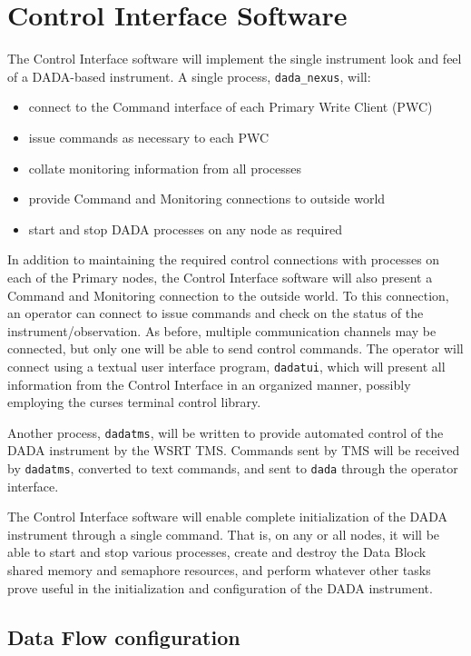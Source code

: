\chapter{Control Interface Software}

The Control Interface software will implement the single instrument
look and feel of a DADA-based instrument.  A single process, {\tt dada\_nexus}, will:

\begin{itemize}
\item connect to the Command interface of each Primary Write Client (PWC)
\item issue commands as necessary to each PWC
\item collate monitoring information from all processes
\item provide Command and Monitoring connections to outside world
\item start and stop DADA processes on any node as required
\end{itemize}

In addition to maintaining the required control connections with
processes on each of the Primary nodes, the Control Interface software
will also present a Command and Monitoring connection to the outside
world.  To this connection, an operator can connect to issue commands
and check on the status of the instrument/observation.  As before,
multiple communication channels may be connected, but only one will be
able to send control commands.  The operator will connect using a
textual user interface program, {\tt dadatui}, which will present all
information from the Control Interface in an organized manner,
possibly employing the curses terminal control library.

Another process, {\tt dadatms}, will be written to provide automated
control of the DADA instrument by the WSRT TMS.  Commands sent by
TMS will be received by {\tt dadatms}, converted to text commands,
and sent to {\tt dada} through the operator interface.

The Control Interface software will enable complete initialization of
the DADA instrument through a single command.  That is, on any or
all nodes, it will be able to start and stop various processes, create
and destroy the Data Block shared memory and semaphore resources, and
perform whatever other tasks prove useful in the initialization and
configuration of the DADA instrument.

\section{Data Flow configuration}

